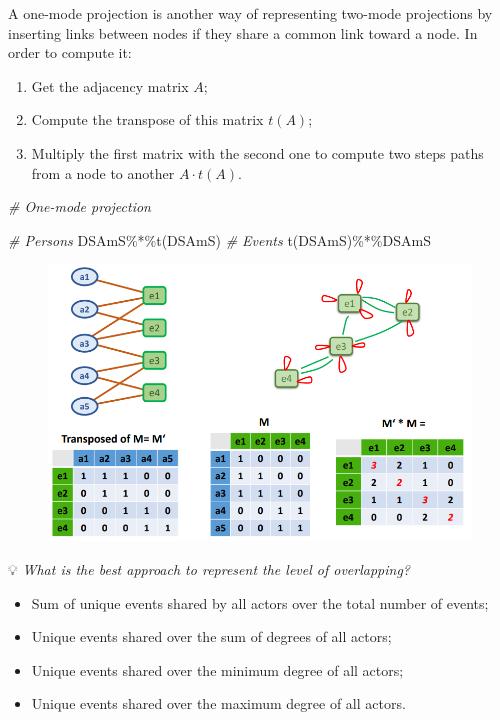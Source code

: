 \documentclass[
  notitlepage,
  onecolumn,
  openany]{book}
\newenvironment{Shaded}{\begin{snugshade}}{\end{snugshade}}
\newcommand{\CommentTok}[1]{\textcolor[rgb]{0.56,0.35,0.01}{\textit{#1}}}
\newcommand{\FunctionTok}[1]{\textcolor[rgb]{0.00,0.00,0.00}{#1}}
\newcommand{\NormalTok}[1]{#1}
\newcommand{\SpecialCharTok}[1]{\textcolor[rgb]{0.00,0.00,0.00}{#1}}
\providecommand{\tightlist}{%
  \setlength{\itemsep}{0pt}\setlength{\parskip}{0pt}}
\begin{document}
A one-mode projection is another way of representing two-mode projections by inserting links between nodes if they share a common link toward a node. In order to compute it:

\begin{enumerate}
\def\labelenumi{\arabic{enumi}.}
\tightlist
\item
  Get the adjacency matrix \(A\);
\item
  Compute the transpose of this matrix \(t(A)\);
\item
  Multiply the first matrix with the second one to compute two steps paths from a node to another \(A \cdot t(A)\).
\end{enumerate}

\begin{Shaded}
\begin{Highlighting}[]
\CommentTok{\# One{-}mode projection}

\CommentTok{\# Persons}
\NormalTok{DSAmS}\SpecialCharTok{\%*\%}\FunctionTok{t}\NormalTok{(DSAmS)}
\CommentTok{\# Events}
\FunctionTok{t}\NormalTok{(DSAmS)}\SpecialCharTok{\%*\%}\NormalTok{DSAmS }
\end{Highlighting}
\end{Shaded}

\begin{figure}[h!]

{\centering \includegraphics[width=0.9\linewidth]{images/10-Two mode networks/Untitled} 

}

\end{figure}

💡 \emph{What is the best approach to represent the level of overlapping?}

\begin{itemize}
\tightlist
\item
  Sum of unique events shared by all actors over the total number of events;
\item
  Unique events shared over the sum of degrees of all actors;
\item
  Unique events shared over the minimum degree of all actors;
\item
  Unique events shared over the maximum degree of all actors.
\end{itemize}
\end{document}
